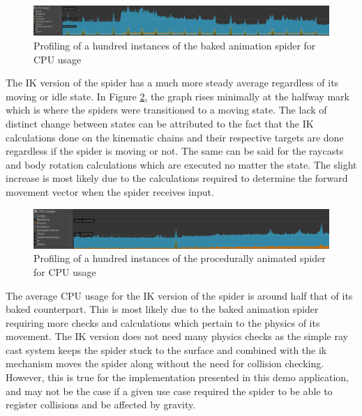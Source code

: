 \begin{figure}[h!]
    \centering
    \captionsetup{justification=centering}
    \includegraphics[width=\textwidth]{grafika/pr_sp_b.png}
    \caption{Profiling of a hundred instances of the baked animation spider for
    CPU usage}
    \label{fig:pr_sp_b}
\end{figure}

The IK version of the spider has a much more steady average regardless of its
moving or idle state. In Figure \ref{fig:pr_sp_ik}, the graph rises minimally at the
halfway mark which is where the spiders were transitioned to a moving state.
The lack of distinct change between states can be attributed to the fact that
the IK calculations done on the kinematic chains and their respective targets
are done regardless if the spider is moving or not. The same can be said for the
raycasts and body rotation calculations which are executed no matter the state.
The slight increase is most likely due to the calculations required to determine
the forward movement vector when the spider receives input. 

\begin{figure}[h!]
    \centering
    \captionsetup{justification=centering}
    \includegraphics[width=\textwidth]{grafika/pr_sp_ik.png}
    \caption{Profiling of a hundred instances of the procedurally animated
    spider for CPU usage}
    \label{fig:pr_sp_ik}
\end{figure}

The average CPU usage for the IK version of the spider is around half that of its
baked counterpart. This is most likely due to the baked animation spider
requiring more checks and calculations which pertain to the physics of its
movement. The IK version does not need many physics checks as the simple ray
cast system keeps the spider stuck to the surface and combined with the ik
mechanism moves the spider along without the need for collision checking.
However, this is true for the implementation presented in this demo application,
and may not be the case if a given use case required the spider to be able to
register collisions and be affected by gravity.

